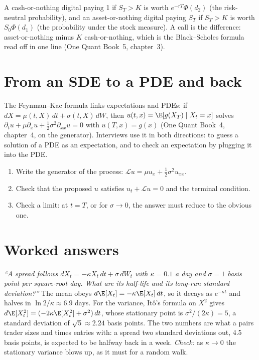 \begin{example}\label{ex:iv:stochastic-calculus:digitals}
A cash-or-nothing digital paying 1 if $S_T > K$ is worth $e^{-rT}\Phi(d_2)$ (the risk-neutral probability), and an
asset-or-nothing digital paying $S_T$ if $S_T > K$ is worth $S_0\Phi(d_1)$ (the probability under the stock measure).
A call is the difference: asset-or-nothing minus $K$ cash-or-nothing, which is the Black--Scholes formula read off in
one line (One Quant Book~5, chapter~3).
\end{example}

\section{From an SDE to a PDE and back}

The Feynman--Kac formula links expectations and PDEs: if $dX = \mu(t,X)\,dt + \sigma(t,X)\,dW$, then $u(t,x) =
\E[g(X_T) \mid X_t = x]$ solves $\partial_t u + \mu\partial_x u + \tfrac12\sigma^2\partial_{xx} u = 0$ with $u(T, x) =
g(x)$ (One Quant Book~4, chapter~4, on the generator). Interviews use it in both directions: to guess a solution of a PDE
as an expectation, and to check an expectation by plugging it into the PDE.

\begin{method}\label{met:iv:stochastic-calculus:fk}
\begin{enumerate}
\item Write the generator of the process: $\mathcal L u = \mu u_x + \tfrac12\sigma^2 u_{xx}$.
\item Check that the proposed $u$ satisfies $u_t + \mathcal L u = 0$ and the terminal condition.
\item Check a limit: at $t = T$, or for $\sigma \to 0$, the answer must reduce to the obvious one.
\end{enumerate}
\end{method}

\section{Worked answers}

\begin{example}\label{ex:iv:stochastic-calculus:ou}
\emph{``A spread follows $dX_t = -\kappa X_t\,dt + \sigma\,dW_t$ with $\kappa = 0.1$ a day and $\sigma = 1$ basis point per
square-root day. What are its half-life and its long-run standard deviation?''} The mean obeys $d\E[X_t] = -\kappa\E[X_t]\,dt$,
so it decays as $e^{-\kappa t}$ and halves in $\ln 2/\kappa \approx 6.9$ days. For the variance, Itô's formula on $X^2$
gives $d\E[X_t^2] = (-2\kappa\E[X_t^2] + \sigma^2)\,dt$, whose stationary point is $\sigma^2/(2\kappa) = 5$, a standard
deviation of $\sqrt5 \approx 2.24$ basis points. The two numbers are what a pairs trader sizes and times entries with: a
spread two standard deviations out, 4.5 basis points, is expected to be halfway back in a week. \emph{Check:} as $\kappa \to
0$ the stationary variance blows up, as it must for a random walk.
\end{example}

